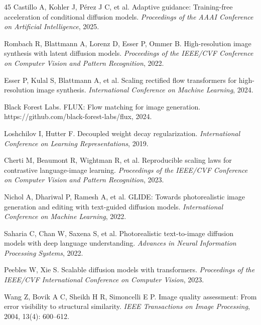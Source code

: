 \documentclass[times,twocolumn,final]{elsarticle}
\providecommand{\DIFadd}[1]{{\protect\color{blue} \sf #1}} %
\providecommand{\DIFaddbegin}{} %
\providecommand{\DIFaddend}{} %
\newcommand{\DIFaddincludegraphics}[2][]{{\color{blue}\fbox{\DIFOincludegraphics[#1]{#2}}}} %
\DeclareRobustCommand{\DIFaddbegin}{\DIFOaddbegin \let\includegraphics\DIFaddincludegraphics} %
\DeclareRobustCommand{\DIFaddend}{\DIFOaddend \let\includegraphics\DIFOincludegraphics} %
\begin{document}
\begin{thebibliography}{45}
Castillo A,   \DIFaddbegin \DIFadd{Kohler J, P\'erez J C}\DIFaddend , et al. Adaptive guidance: Training-free acceleration of conditional diffusion models.  
 \DIFaddbegin \DIFadd{\textit{Proceedings of the AAAI Conference on Artificial Intelligence}, 2025.}\DIFaddend






Rombach R, Blattmann A, Lorenz D, Esser P, Ommer B. High-resolution image synthesis with latent diffusion models. \textit{Proceedings of the IEEE/CVF Conference on Computer Vision and Pattern Recognition}, 2022.

Esser P, Kulal S, Blattmann A, et al. Scaling rectified flow transformers for high-resolution image synthesis. \textit{International Conference on Machine Learning}, 2024.

Black Forest Labs. FLUX: Flow matching for image generation. \DIFaddbegin \DIFadd{https://github.com/black-forest-labs/flux, }\DIFaddend 2024.

Loshchilov I, Hutter F. Decoupled weight decay regularization. \textit{International Conference on Learning Representations}, 2019.

Cherti M, Beaumont R, Wightman R, et al. Reproducible scaling laws for contrastive language-image learning. \textit{Proceedings of the IEEE/CVF Conference on Computer Vision and Pattern Recognition}, 2023.

Nichol A, Dhariwal P, Ramesh A, et al. GLIDE: Towards photorealistic image generation and editing with text-guided diffusion models. \textit{International Conference on Machine Learning}, 2022.

Saharia C, Chan W, Saxena S, et al. Photorealistic text-to-image diffusion models with deep language understanding. \textit{Advances in Neural Information Processing Systems}, 2022.

Peebles W, Xie S. Scalable diffusion models with transformers. \textit{Proceedings of the IEEE/CVF International Conference on Computer Vision}, 2023.
\DIFaddbegin

\DIFadd{Wang Z, Bovik A C, Sheikh H R, Simoncelli E P. Image quality assessment: From error visibility to structural similarity. \textit{IEEE Transactions on Image Processing}, 2004, 13(4): 600--612.
}


\end{thebibliography}
\end{document}
